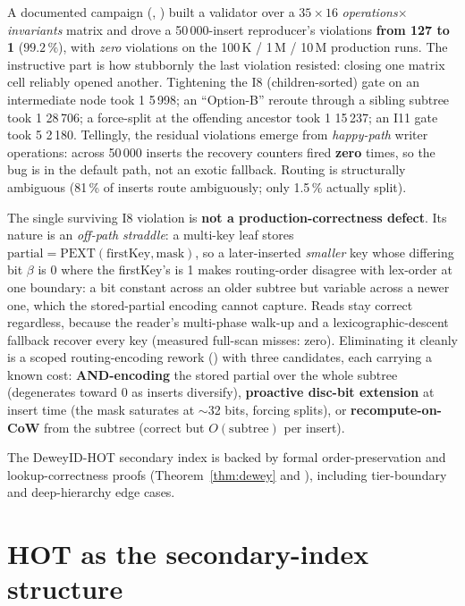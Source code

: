 \documentclass[11pt,a4paper,oneside]{report}
\theoremstyle{sirixthm}
\begin{document}
A documented campaign (, )
built a validator over a $35 \times 16$ \emph{operations}$\times$\emph{invariants} matrix and drove a
50\,000-insert reproducer's violations \textbf{from 127 to 1} ($99.2\,\%$), with \emph{zero} violations
on the 100\,K / 1\,M / 10\,M production runs. The instructive part is how stubbornly the last violation
resisted: closing one matrix cell reliably opened another. Tightening the I8 (children-sorted) gate on
an intermediate node took 1\,\textrightarrow\,5\,998; an ``Option-B'' reroute through a sibling subtree
took 1\,\textrightarrow\,28\,706; a force-split at the offending ancestor took
1\,\textrightarrow\,15\,237; an I11 gate took 5\,\textrightarrow\,2\,180. Tellingly, the residual
violations emerge from \emph{happy-path} writer operations: across 50\,000 inserts the recovery
counters fired \textbf{zero} times, so the bug is in the default path, not an exotic fallback. Routing is
structurally ambiguous (81\,\% of inserts route ambiguously; only 1.5\,\% actually split).

The single surviving I8 violation is \textbf{not a production-correctness defect}. Its nature is an
\emph{off-path straddle}: a multi-key leaf stores $\text{partial} = \text{PEXT}(\text{firstKey},\text{mask})$,
so a later-inserted \emph{smaller} key whose differing bit $\beta$ is 0 where the firstKey's is 1 makes
routing-order disagree with lex-order at one boundary: a bit constant across an older subtree but
variable across a newer one, which the stored-partial encoding cannot capture. Reads stay correct
regardless, because the reader's multi-phase walk-up and a lexicographic-descent fallback recover every
key (measured full-scan misses: zero). Eliminating it cleanly is a scoped routing-encoding rework
() with three candidates, each carrying a known cost:
\textbf{AND-encoding} the stored partial over the whole subtree (degenerates toward 0 as inserts
diversify), \textbf{proactive disc-bit extension} at insert time (the mask saturates at $\sim$32 bits,
forcing splits), or \textbf{recompute-on-CoW} from the subtree (correct but $O(\text{subtree})$ per
insert).

The DeweyID-HOT secondary index is backed by formal order-preservation and lookup-correctness
proofs (Theorem~\ref{thm:dewey} and ), including
tier-boundary and deep-hierarchy edge cases.

\section{HOT as the secondary-index structure}
\end{document}
